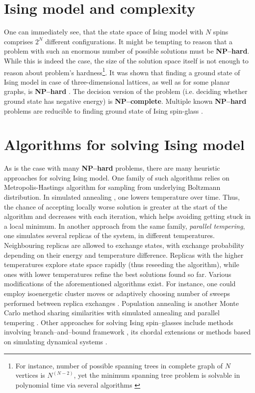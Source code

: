 \section{Ising model and complexity}

One can immediately see, that the state space of Ising model with $N$ spins comprises $2^{N}$ different configurations. It might be tempting to reason that a problem with such an enormous number of possible solutions must be \textbf{NP--hard}. While this is indeed the case, the size of the solution space itself is not enough to reason about problem's hardness\footnote{For instance, number of possible spanning trees in complete graph of $N$ vertices is $N^{(N-2)}$, yet the minimum spanning tree problem is solvable in polynomial time via several  algorithms \cite{clrs}}.
It was shown that finding a ground state of Ising model in case of three-dimensional lattices, as well as for some planar graphs,  is \textbf{NP--hard} \cite{barahoma}. The decision version of the problem (i.e. deciding whether ground state has negative energy) is \textbf{NP--complete}. Multiple known \textbf{NP--hard} problems are reducible to finding ground state of Ising spin-glass \cite{lucas}.

\section{Algorithms for solving Ising model}

As is the case with many \textbf{NP--hard} problems, there are many heuristic approaches for solving Ising model. One family of such algorithms relies on Metropolis-Hastings \cite{beichl} algorithm for sampling from underlying Boltzmann distribution. In simulated annealing \cite{cook}, one lowers temperature over time. Thus, the chance of accepting locally worse solution is greater at the start of the algorithm and decreases with each iteration, which helps avoiding getting stuck in a local minimum. In another approach from the same family, \emph{parallel tempering}, one simulates several replicas of the system, in different temperatures. Neighbouring replicas are allowed to exchange states, with exchange probability depending on their energy and temperature difference. Replicas with the higher temperatures explore state space rapidly (thus reseeding the algorithm), while ones with lower temperatures refine the best solutions found so far. Various modifications of the aforementioned algorithms exist. For instance, one could employ isoenergetic cluster moves \cite{zhu} or adaptively choosing number of sweeps performed between replica exchanges \cite{bittner}. Population annealing is another Monte Carlo method sharing similarities with simulated annealing and parallel tempering \cite{wang}. Other approaches for solving Ising spin--glasses include methods involving branch--and--bound framework \cite{rendl}, its chordal extensions \cite{baccari} or methods based on simulating dynamical systems \cite{sheldon}.

